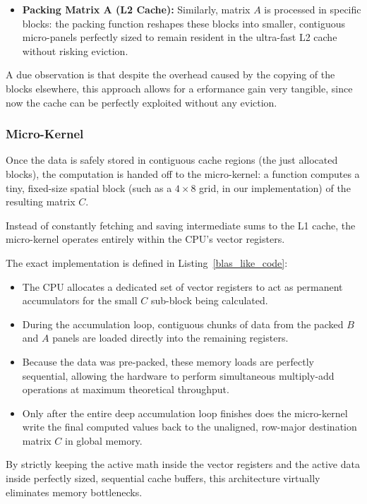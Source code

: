 \begin{appendices}
\begin{itemize}
    \item \textbf{Packing Matrix A (L2 Cache):} Similarly, matrix $A$ is processed in specific blocks: the packing function reshapes these blocks into smaller, contiguous micro-panels perfectly sized to remain resident in the ultra-fast L2 cache without risking eviction.
\end{itemize}

A due observation is that despite the overhead caused by the copying of the blocks elsewhere, this approach allows for a erformance gain very tangible, since now the cache can be perfectly exploited without any eviction.

\subsubsection{Micro-Kernel} 
Once the data is safely stored in contiguous cache regions (the just allocated blocks), the computation is handed off to the micro-kernel: a function computes a tiny, fixed-size spatial block (such as a $4\times8$ grid, in our implementation) of the resulting matrix $C$. 

Instead of constantly fetching and saving intermediate sums to the L1 cache, the micro-kernel operates entirely  within the CPU's vector registers. 

The exact implementation is defined in Listing~\ref{blas_like_code}:
\begin{itemize}
    \item The CPU allocates a dedicated set of vector registers to act as permanent accumulators for the small $C$ sub-block being calculated.
    \item During the accumulation loop, contiguous chunks of data from the packed $B$ and $A$ panels are loaded directly into the remaining registers.
    \item Because the data was pre-packed, these memory loads are perfectly sequential, allowing the hardware to perform simultaneous multiply-add operations at maximum theoretical throughput.
    \item Only after the entire deep accumulation loop finishes does the micro-kernel write the final computed values back to the unaligned, row-major destination matrix $C$ in global memory. 
\end{itemize}

By strictly keeping the active math inside the vector registers and the active data inside perfectly sized, sequential cache buffers, this architecture virtually eliminates memory bottlenecks.
\end{appendices}